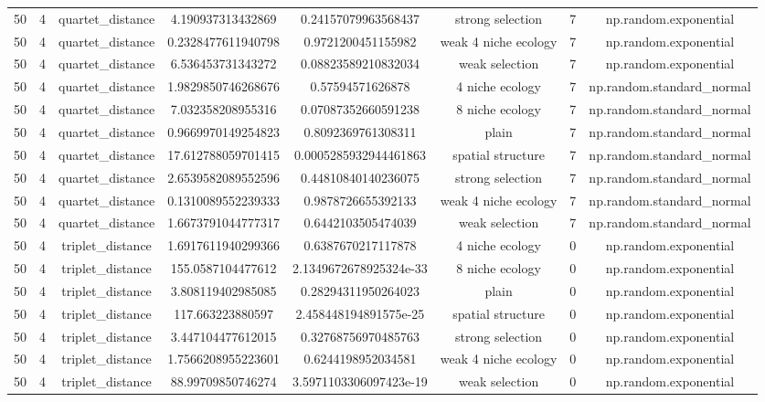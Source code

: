 \begin{table}[h!]
\begin{tabular}{||c c c c c c c c||}
50 & 4 & quartet\_distance & 4.190937313432869 & 0.24157079963568437 & strong selection & 7 & np.random.exponential \\ 
50 & 4 & quartet\_distance & 0.2328477611940798 & 0.9721200451155982 & weak 4 niche ecology & 7 & np.random.exponential \\ 
50 & 4 & quartet\_distance & 6.536453731343272 & 0.08823589210832034 & weak selection & 7 & np.random.exponential \\ 
50 & 4 & quartet\_distance & 1.9829850746268676 & 0.57594571626878 & 4 niche ecology & 7 & np.random.standard\_normal \\ 
50 & 4 & quartet\_distance & 7.032358208955316 & 0.07087352660591238 & 8 niche ecology & 7 & np.random.standard\_normal \\ 
50 & 4 & quartet\_distance & 0.9669970149254823 & 0.8092369761308311 & plain & 7 & np.random.standard\_normal \\ 
50 & 4 & quartet\_distance & 17.612788059701415 & 0.0005285932944461863 & spatial structure & 7 & np.random.standard\_normal \\ 
50 & 4 & quartet\_distance & 2.6539582089552596 & 0.44810840140236075 & strong selection & 7 & np.random.standard\_normal \\ 
50 & 4 & quartet\_distance & 0.1310089552239333 & 0.9878726655392133 & weak 4 niche ecology & 7 & np.random.standard\_normal \\ 
50 & 4 & quartet\_distance & 1.6673791044777317 & 0.6442103505474039 & weak selection & 7 & np.random.standard\_normal \\ 
50 & 4 & triplet\_distance & 1.6917611940299366 & 0.6387670217117878 & 4 niche ecology & 0 & np.random.exponential \\ 
50 & 4 & triplet\_distance & 155.0587104477612 & 2.1349672678925324e-33 & 8 niche ecology & 0 & np.random.exponential \\ 
50 & 4 & triplet\_distance & 3.808119402985085 & 0.28294311950264023 & plain & 0 & np.random.exponential \\ 
50 & 4 & triplet\_distance & 117.663223880597 & 2.458448194891575e-25 & spatial structure & 0 & np.random.exponential \\ 
50 & 4 & triplet\_distance & 3.447104477612015 & 0.32768756970485763 & strong selection & 0 & np.random.exponential \\ 
50 & 4 & triplet\_distance & 1.7566208955223601 & 0.6244198952034581 & weak 4 niche ecology & 0 & np.random.exponential \\ 
50 & 4 & triplet\_distance & 88.99709850746274 & 3.5971103306097423e-19 & weak selection & 0 & np.random.exponential \\ 

\end{tabular}
\end{table}

